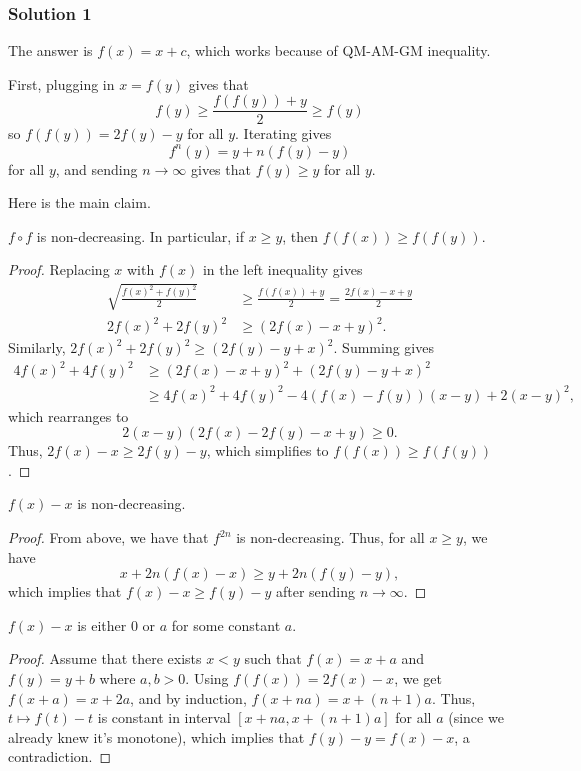 \documentclass[11pt]{article}
\begin{document}
\subsubsection{Solution 1}
The answer is $\boxed{f(x)=x+c}$, which works because of QM-AM-GM inequality.

\medskip
\noindent
First, plugging in $x=f(y)$ gives that
$$f(y) \geq \frac{f(f(y)) + y}2 \geq f(y)$$so $\boxed{f(f(y)) = 2f(y)-y}$ for all $y$. Iterating gives
$$f^n(y) = y + n(f(y)-y)$$for all $y$, and sending $n\to\infty$ gives that $\boxed{f(y)\geq y}$ for all $y$.

\medskip
\noindent
Here is the main claim.
\begin{claim}
     $f\circ f$ is non-decreasing. In particular, if $x\geq y$, then $f(f(x))\geq f(f(y))$.
\end{claim}
\begin{proof}
    Replacing $x$ with $f(x)$ in the left inequality gives
\begin{align*}
\sqrt{\frac{f(x)^2 + f(y)^2}2} &\geq \frac{f(f(x)) + y}2 = \frac{2f(x)-x+y}2 \\
2f(x)^2 + 2f(y)^2 &\geq (2f(x)-x+y)^2.
\end{align*}Similarly, $2f(x)^2 + 2f(y)^2 \geq (2f(y)-y+x)^2$. Summing gives
\begin{align*}
4f(x)^2 + 4f(y)^2 &\geq (2f(x)-x+y)^2 + (2f(y)-y+x)^2 \\
&\geq 4f(x)^2 + 4f(y)^2 - 4(f(x)-f(y))(x-y) + 2(x-y)^2,
\end{align*}which rearranges to
$$2(x-y)(2f(x)-2f(y)-x+y) \geq 0.$$Thus, $2f(x)-x \geq 2f(y)-y$, which simplifies to $f(f(x))\geq f(f(y))$. 
\end{proof}
\begin{claim}
     $f(x)-x$ is non-decreasing.
\end{claim}
\begin{proof}
    From above, we have that $f^{2n}$ is non-decreasing. Thus, for all $x\geq y$, we have
$$x+2n(f(x)-x) \geq y+2n(f(y)-y),$$which implies that $f(x)-x\geq f(y)-y$ after sending $n\to\infty$. 
\end{proof}
\begin{claim}
     $f(x)-x$ is either $0$ or $a$ for some constant $a$.
\end{claim}
\begin{proof}
    Assume that there exists $x<y$ such that $f(x)=x+a$ and $f(y)=y+b$ where $a,b>0$. Using $f(f(x)) = 2f(x)-x$, we get $f(x+a)=x+2a$, and by induction, $f(x+na) = x+(n+1)a$. Thus, $t\mapsto f(t)-t$ is constant in interval $[x+na, x+(n+1)a]$ for all $a$ (since we already knew it's monotone), which implies that $f(y)-y = f(x)-x$, a contradiction. 
\end{proof}
\end{document}
